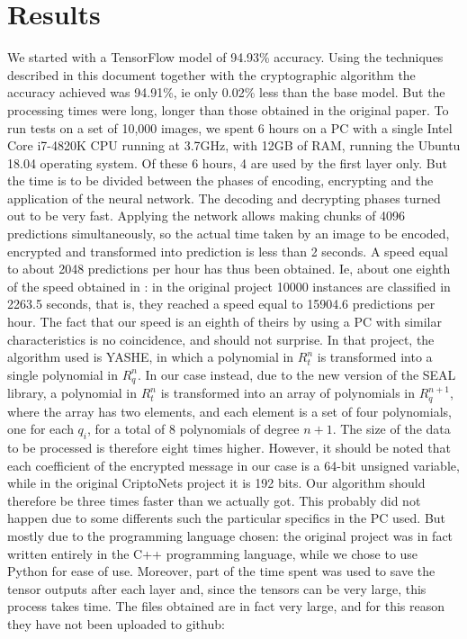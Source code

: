 \section{Results}

We started with a TensorFlow model of 94.93\% accuracy. Using the techniques described in this document together with the cryptographic algorithm the accuracy achieved was 94.91\%, ie only 0.02\% less than the base model. But the processing times were long, longer than those obtained in the original paper. To run tests on a set of 10,000 images, we spent 6 hours on a PC with a single Intel Core i7-4820K CPU running at 3.7GHz, with 12GB of RAM, running the Ubuntu 18.04 operating system. Of these 6 hours, 4 are used by the first layer only. But the time is to be divided between the phases of encoding, encrypting and the application of the neural network. The decoding and decrypting phases turned out to be very fast. Applying the network allows making chunks of 4096 predictions simultaneously, so the actual time taken by an image to be encoded, encrypted and transformed into prediction is less than 2 seconds. A speed equal to about 2048 predictions per hour has thus been obtained. Ie, about one eighth of the speed obtained in \cite{dowlin2016cryptonets}: in the original project 10000 instances are classified in 2263.5 seconds, that is, they reached a speed equal to 15904.6 predictions per hour. The fact that our speed is an eighth of theirs by using a PC with similar characteristics is no coincidence, and should not surprise. In that project, the algorithm used is YASHE, in which a polynomial in $R^n_t$ is transformed into a single polynomial in $R^n_q$. In our case instead, due to the new version of the SEAL library, a polynomial in $R^n_t$ is transformed into an array of polynomials in $R^{n+1}_q$, where the array has two elements, and each element is a set of four polynomials, one for each $q_i$, for a total of 8 polynomials of degree $n+1$. The size of the data to be processed is therefore eight times higher. However, it should be noted that each coefficient of the encrypted message in our case is a 64-bit unsigned variable, while in the original CriptoNets project it is 192 bits. Our algorithm should therefore be three times faster than we actually got. This probably did not happen due to some differents such the particular specifics in the PC used. But mostly due to the programming language chosen: the original project was in fact written entirely in the C++ programming language, while we chose to use Python for ease of use. Moreover, part of the time spent was used to save the tensor outputs after each layer and, since the tensors can be very large, this process takes time. The files obtained are in fact very large, and for this reason they have not been uploaded to github:


